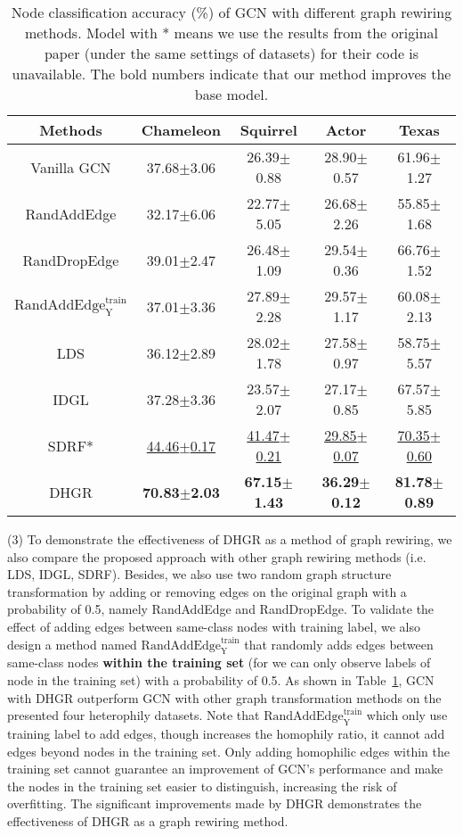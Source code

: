 \documentclass[sigconf]{acmart}
\begin{document}
	\begin{table}
\centering
		\setlength{\tabcolsep}{1pt}
		\caption{Node classification accuracy (\%) of GCN with different graph rewiring methods. Model with * means we use the results from the original paper (under the same settings of datasets) for their code is unavailable.  The bold numbers indicate that our method improves the base model.}
		\label{tab:res_g_trans}
		\begin{tabular}{ccccc}
			\toprule
Methods  & Chameleon & Squirrel & Actor & Texas \\
			\midrule
Vanilla GCN & 37.68$\pm$3.06 & 26.39$\pm$0.88 & 28.90$\pm$0.57 & 61.96$\pm$1.27 \\
			RandAddEdge & 32.17$\pm$6.06 & 22.77$\pm$5.05 & 26.68$\pm$2.26 & 55.85$\pm$1.68 \\
			RandDropEdge & 39.01$\pm$2.47 & 26.48$\pm$1.09 & 29.54$\pm$0.36 &66.76$\pm$1.52 \\
			$\text{RandAddEdge}_\text{Y}^\text{train}$ & 37.01$\pm$3.36 & 27.89$\pm$2.28 & 29.57$\pm$1.17 & 60.08$\pm$2.13 \\
			LDS & 36.12$\pm$2.89 & 28.02$\pm$1.78 & 27.58$\pm$0.97 & 58.75$\pm$5.57 \\
			IDGL & 37.28$\pm$3.36 & 23.57$\pm$2.07 & 27.17$\pm$0.85 & {67.57$\pm$5.85} \\
			SDRF* & \underline{44.46$\pm$0.17} & \underline{41.47$\pm$0.21} & \underline{29.85$\pm$0.07} & \underline{70.35$\pm$0.60}\\
			DHGR & \textbf{70.83$\pm$2.03} & \textbf{67.15$\pm$1.43} & \textbf{36.29$\pm$0.12} & \textbf{81.78$\pm$0.89} \\
			\bottomrule
		\end{tabular}
	\end{table}
	
	
	
	(3) To demonstrate the effectiveness of DHGR as a method of graph rewiring, we also compare the proposed approach with other graph rewiring methods (i.e. LDS, IDGL, SDRF). Besides, we also use two random graph structure transformation by adding or removing edges on the original graph with a probability of 0.5, namely RandAddEdge and RandDropEdge. To validate the effect of adding edges between same-class nodes with training label, we also design a method named $\text{RandAddEdge}_\text{Y}^\text{train}$ that randomly adds edges between same-class nodes \textbf{within the training set} (for we can only observe labels of node in the training set) with a probability of 0.5. As shown in Table~\ref{tab:res_g_trans}, GCN with DHGR outperform GCN with other graph transformation methods on the presented four heterophily datasets. Note that $\text{RandAddEdge}_\text{Y}^\text{train}$ which only use training label to add edges, though increases the homophily ratio, it cannot add edges beyond nodes in the training set. Only adding homophilic edges within the training set cannot guarantee an improvement of GCN's performance and make the nodes in the training set easier to distinguish, increasing the risk of overfitting. The significant improvements made by DHGR demonstrates the effectiveness of DHGR  as a  graph rewiring method. 
	
\end{document}
